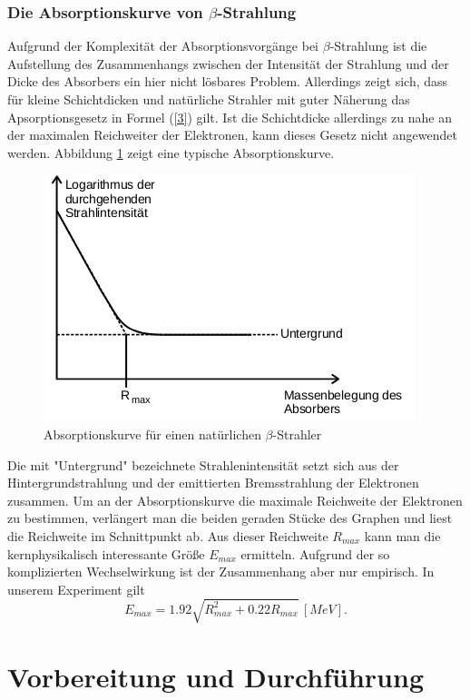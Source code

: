 \documentclass[11pt,ngerman,a4paper]{article}
\begin{document}
\subsubsection{Die Absorptionskurve von $\beta$-Strahlung}
Aufgrund der Komplexität der Absorptionsvorgänge bei $\beta$-Strahlung ist die Aufstellung des Zusammenhangs zwischen der Intensität der Strahlung und der Dicke des Absorbers ein hier nicht lösbares Problem. Allerdings zeigt sich, dass für kleine Schichtdicken und natürliche Strahler mit guter Näherung das Apsorptionsgesetz in Formel (\ref{3}) gilt. Ist die Schichtdicke allerdings zu nahe an der maximalen Reichweiter der Elektronen, kann dieses Gesetz nicht angewendet werden. Abbildung \ref{a3} zeigt eine typische Absorptionskurve.
\begin{figure}[h]
\centering
\includegraphics[scale=0.9]{abb3.png}
\caption{Absorptionskurve für einen natürlichen $\beta$-Strahler}
\label{a3}
\end{figure}
 Die mit "Untergrund" bezeichnete Strahlenintensität setzt sich aus der Hintergrundstrahlung und der emittierten Bremsstrahlung der Elektronen zusammen. Um an der Absorptionskurve die maximale Reichweite der Elektronen zu bestimmen, verlängert man die beiden geraden Stücke des Graphen und liest die Reichweite im Schnittpunkt ab. Aus dieser Reichweite $R_{max}$ kann man die kernphysikalisch interessante Größe $E_{max}$ ermitteln. Aufgrund der so komplizierten Wechselwirkung ist der Zusammenhang aber nur empirisch. In unserem Experiment gilt
\begin{equation}
E_{max} = 1.92\sqrt{R_{max}^2 + 0.22 R_{max}}\, [MeV].
\label{10}
\end{equation}
\section{Vorbereitung und Durchführung}
\end{document}
